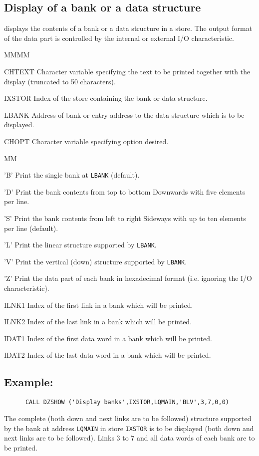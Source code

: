 \subsection{Display of a bank or a data structure}
\par {} displays the contents of a bank or a data structure in a
store. The output format of the data part is controlled by the internal
or external I/O characteristic.
\Idesc
\begin{DL}{MMMM}
\item[CHTEXT]Character variable specifying the text to be printed
together with the display (truncated to 50 characters).
\item[IXSTOR]Index of the store containing the bank or data structure.
\item[LBANK]Address of bank or entry address to the data structure
which is to be displayed.
\item[CHOPT]Character variable specifying option desired.
\begin{DL}{MM}
\item['B']Print the single bank at {\tt LBANK} (default).
\item['D']Print the bank contents from top to bottom Downwards
with five elements per line.
\item['S']Print the bank contents from left to right Sideways
with up to ten elements per line (default).
\item['L']Print the linear structure supported by {\tt LBANK}.
\item['V']Print the vertical (down) structure supported by {\tt LBANK}.
\item['Z']Print the data part of each bank in hexadecimal format
(i.e. ignoring the I/O characteristic).
\end{DL}
\item[ILNK1]Index of the first link in a bank which will be printed.
\item[ILNK2]Index of the last link in a bank which will be printed.
\item[IDAT1]Index of the first data word in a bank which will be printed.
\item[IDAT2]Index of the last data word in a bank which will be printed.
\end{DL}
\subsection{Example:}
\begin{verbatim}
      CALL DZSHOW ('Display banks',IXSTOR,LQMAIN,'BLV',3,7,0,0)
\end{verbatim}
The complete (both down and next links are to be followed)
structure supported by the bank
at address {\tt LQMAIN} in  store {\tt IXSTOR} is to
be displayed (both down and next links are to be followed).
Links 3 to 7 and all data words of each bank are to be printed.
